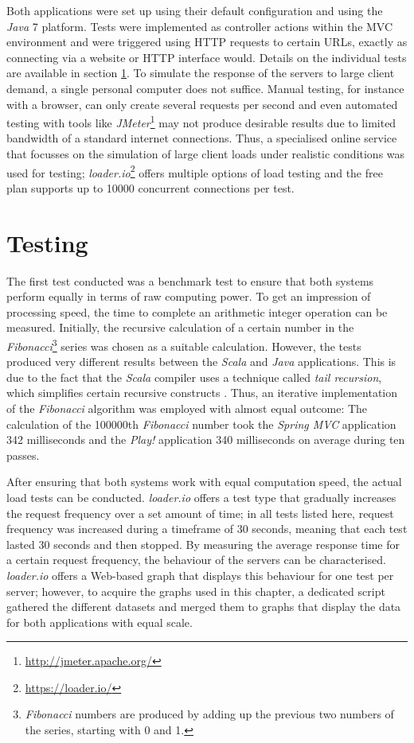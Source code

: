 Both applications were set up using their default configuration and using the \textit{Java} 7 platform. Tests were implemented as controller actions within the MVC environment and were triggered using HTTP requests to certain URLs, exactly as connecting via a website or HTTP interface would. Details on the individual tests are available in section \ref{lab:testing}. To simulate the response of the servers to large client demand, a single personal computer does not suffice. Manual testing, for instance with a browser, can only create several requests per second and even automated testing with tools like \textit{JMeter}\footnote{\url{http://jmeter.apache.org/}} may not produce desirable results due to limited bandwidth of a standard internet connections. Thus, a specialised online service that focusses on the simulation of large client loads under realistic conditions was used for testing; \textit{loader.io}\footnote{\url{https://loader.io/}} offers multiple options of load testing and the free plan supports up to 10000 concurrent connections per test.

\section{Testing} 
\label{lab:testing}
The first test conducted was a benchmark test to ensure that both systems perform equally in terms of raw computing power. To get an impression of processing speed, the time to complete an arithmetic integer operation can be measured. Initially, the recursive calculation of a certain number in the \textit{Fibonacci}\footnote{\textit{Fibonacci} numbers are produced by adding up the previous two numbers of the series, starting with 0 and 1.} series was chosen as a suitable calculation. However, the tests produced very different results between the \textit{Scala} and \textit{Java} applications. This is due to the fact that the \textit{Scala} compiler uses a technique called \textit{tail recursion}, which simplifies certain recursive constructs \cite{Malone2008}. Thus, an iterative implementation of the \textit{Fibonacci} algorithm was employed with almost equal outcome: The calculation of the 100000th \textit{Fibonacci} number took the \textit{Spring MVC} application 342 milliseconds and the \textit{Play!} application 340 milliseconds on average during ten passes.

After ensuring that both systems work with equal computation speed, the actual load tests can be conducted. \textit{loader.io} offers a test type that gradually increases the request frequency over a set amount of time; in all tests listed here, request frequency was increased during a timeframe of 30 seconds, meaning that each test lasted 30 seconds and then stopped. By measuring the average response time for a certain request frequency, the behaviour of the servers can be characterised. \textit{loader.io} offers a Web-based graph that displays this behaviour for one test per server; however, to acquire the graphs used in this chapter, a dedicated script gathered the different datasets and merged them to graphs that display the data for both applications with equal scale.

